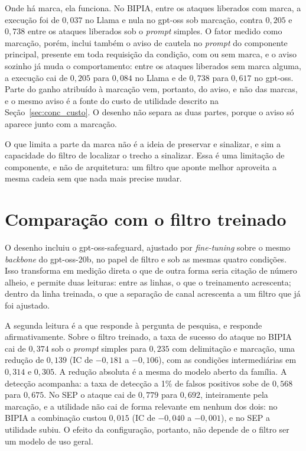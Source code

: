 Onde há marca, ela funciona. No BIPIA, entre os ataques liberados com marca,
a execução foi de $0{,}037$ no Llama e nula no gpt-oss sob marcação, contra
$0{,}205$ e $0{,}738$ entre os ataques liberados sob o \textit{prompt}
simples. O fator medido como marcação, porém, inclui também o aviso de
cautela no \textit{prompt} do componente principal, presente em toda
requisição da condição, com ou sem marca, e o aviso sozinho já muda o
comportamento: entre os ataques liberados sem marca alguma, a execução cai de
$0{,}205$ para $0{,}084$ no Llama e de $0{,}738$ para $0{,}617$ no gpt-oss.
Parte do ganho atribuído à marcação vem, portanto, do aviso, e não das
marcas, e o mesmo aviso é a fonte do custo de utilidade descrito na
Seção~\ref{sec:conc_custo}. O desenho não separa as duas partes, porque o
aviso só aparece junto com a marcação.

O que limita a parte da marca não é a ideia de preservar e sinalizar, e sim a
capacidade do filtro de localizar o trecho a sinalizar. Essa é uma limitação
de componente, e não de arquitetura: um filtro que aponte melhor aproveita a
mesma cadeia sem que nada mais precise mudar.

\section{Comparação com o filtro treinado}\label{sec:conc_guards}

O desenho incluiu o gpt-oss-safeguard, ajustado por \textit{fine-tuning} sobre
o mesmo \textit{backbone} do gpt-oss-20b, no papel de filtro e sob as mesmas
quatro condições. Isso transforma em medição direta o que de outra forma seria
citação de número alheio, e permite duas leituras: entre as linhas, o que o
treinamento acrescenta; dentro da linha treinada, o que a separação de canal
acrescenta a um filtro que já foi ajustado.

A segunda leitura é a que responde à pergunta de pesquisa, e responde
afirmativamente. Sobre o filtro treinado, a taxa de sucesso do ataque no BIPIA
cai de $0{,}374$ sob o \textit{prompt} simples para $0{,}235$ com delimitação e
marcação, uma redução de $0{,}139$ (IC de $-0{,}181$ a $-0{,}106$), com as
condições intermediárias em $0{,}314$ e $0{,}305$. A redução absoluta é a
mesma do modelo aberto da família. A detecção acompanha: a taxa de detecção a
1\% de falsos positivos sobe de $0{,}568$ para $0{,}675$. No SEP o ataque cai
de $0{,}779$ para $0{,}692$, inteiramente pela marcação, e a utilidade não
cai de forma relevante em nenhum dos dois: no BIPIA a combinação custou
$0{,}015$ (IC de $-0{,}040$ a $-0{,}001$), e no SEP a utilidade subiu. O
efeito da configuração, portanto, não depende de o filtro ser um modelo de uso
geral.


